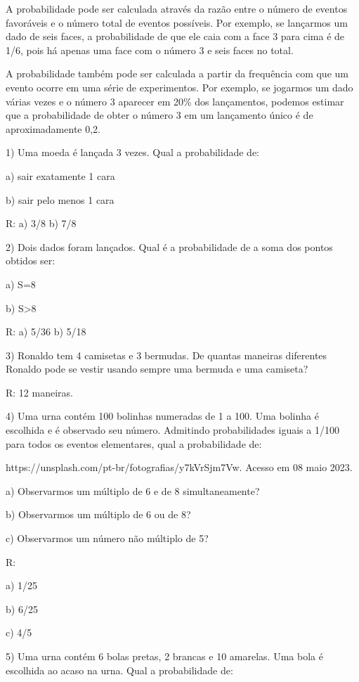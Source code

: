 A probabilidade pode ser calculada através da razão entre o número de
eventos favoráveis e o número total de eventos possíveis. Por exemplo,
se lançarmos um dado de seis faces, a probabilidade de que ele caia com
a face 3 para cima é de 1/6, pois há apenas uma face com o número 3 e
seis faces no total.

A probabilidade também pode ser calculada a partir da frequência com que
um evento ocorre em uma série de experimentos. Por exemplo, se jogarmos
um dado várias vezes e o número 3 aparecer em 20\% dos lançamentos,
podemos estimar que a probabilidade de obter o número 3 em um lançamento
único é de aproximadamente 0,2.


1) Uma moeda é lançada 3 vezes. Qual a probabilidade de:

a) sair exatamente 1 cara

b) sair pelo menos 1 cara

R: a) 3/8 b) 7/8

2) Dois dados foram lançados. Qual é a probabilidade de a soma dos
pontos obtidos ser:

a) S=8

b) S\textgreater8

R: a) 5/36 b) 5/18

3) Ronaldo tem 4 camisetas e 3 bermudas. De quantas maneiras diferentes
Ronaldo pode se vestir usando sempre uma bermuda e uma camiseta?

R: 12 maneiras.

4) Uma urna contém 100 bolinhas numeradas de 1 a 100. Uma bolinha é
escolhida e é observado seu número. Admitindo probabilidades iguais a
1/100 para todos os eventos elementares, qual a probabilidade de:

https://unsplash.com/pt-br/fotografias/y7kVrSjm7Vw. Acesso em 08 maio
2023.

a) Observarmos um múltiplo de 6 e de 8 simultaneamente?

b) Observarmos um múltiplo de 6 ou de 8?

c) Observarmos um número não múltiplo de 5?

R:

a) 1/25

b) 6/25

c) 4/5

5) Uma urna contém 6 bolas pretas, 2 brancas e 10 amarelas. Uma bola é
escolhida ao acaso na urna. Qual a probabilidade de:

